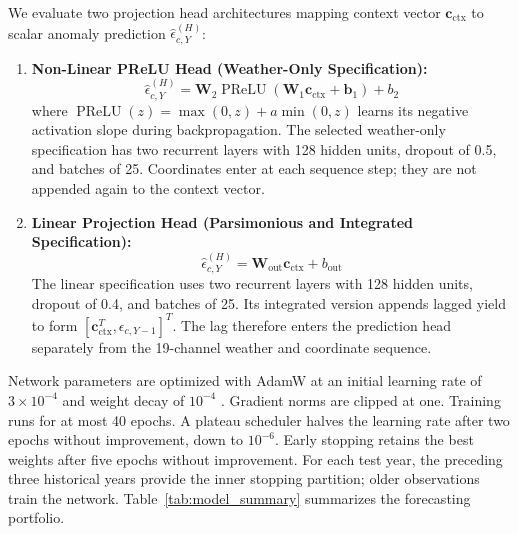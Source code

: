 We evaluate two projection head architectures mapping context vector $\mathbf{c}_{\text{ctx}}$ to scalar anomaly prediction $\hat{\epsilon}_{c,Y}^{(H)}$:
\begin{enumerate}
    \item \textbf{Non-Linear PReLU Head (Weather-Only Specification):}
    \begin{equation}
        \hat{\epsilon}_{c,Y}^{(H)} = \mathbf{W}_2 \operatorname{PReLU}\left(\mathbf{W}_1 \mathbf{c}_{\text{ctx}} + \mathbf{b}_1\right) + b_2
        \label{eq:lstm_prelu_head}
    \end{equation}
    where $\operatorname{PReLU}(z)=\max(0,z)+a\min(0,z)$ learns its negative activation slope during backpropagation. The selected weather-only specification has two recurrent layers with 128 hidden units, dropout of 0.5, and batches of 25. Coordinates enter at each sequence step; they are not appended again to the context vector.
    \item \textbf{Linear Projection Head (Parsimonious and Integrated Specification):}
    \begin{equation}
        \hat{\epsilon}_{c,Y}^{(H)} = \mathbf{W}_{\text{out}} \mathbf{c}_{\text{ctx}} + b_{\text{out}}
        \label{eq:lstm_linear_head}
    \end{equation}
    The linear specification uses two recurrent layers with 128 hidden units, dropout of 0.4, and batches of 25. Its integrated version appends lagged yield to form $[\mathbf{c}_{\text{ctx}}^T,\epsilon_{c,Y-1}]^T$. The lag therefore enters the prediction head separately from the 19-channel weather and coordinate sequence.
\end{enumerate}

Network parameters are optimized with AdamW at an initial learning rate of $3\times10^{-4}$ and weight decay of $10^{-4}$ \citep{Geron2025}. Gradient norms are clipped at one. Training runs for at most 40 epochs. A plateau scheduler halves the learning rate after two epochs without improvement, down to $10^{-6}$. Early stopping retains the best weights after five epochs without improvement. For each test year, the preceding three historical years provide the inner stopping partition; older observations train the network. Table~\ref{tab:model_summary} summarizes the forecasting portfolio.

